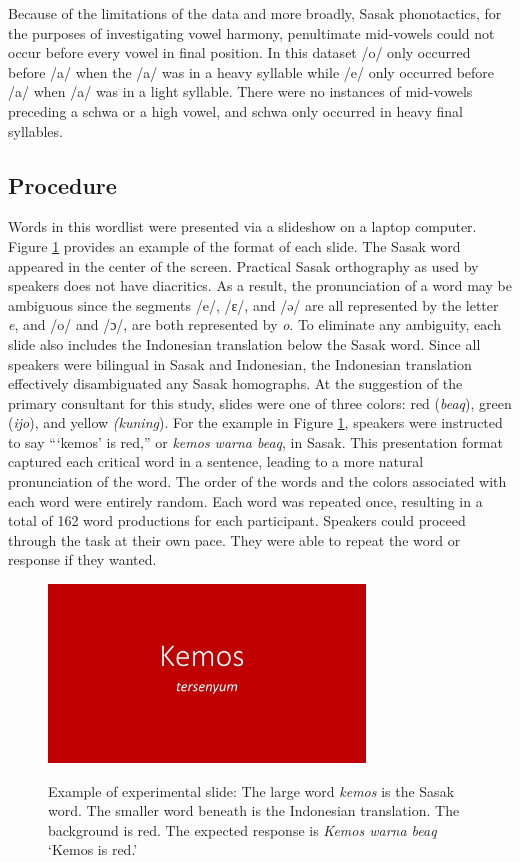 \documentclass[12pt]{ouparticle}
\begin{document}
Because of the limitations of the data and more broadly, Sasak phonotactics, for the purposes of investigating vowel harmony, penultimate mid-vowels could not occur before every vowel in final position. In this dataset /o/ only occurred before /a/ when the /a/ was in a heavy syllable while /e/ only occurred before /a/ when /a/ was in a light syllable. There were no instances of mid-vowels preceding a schwa or a high vowel, and schwa only occurred in heavy final syllables.

\subsection{Procedure}\label{sec:procedure}

Words in this wordlist were presented via a slideshow on a laptop computer. Figure \ref{fig:kemos} provides an example of the format of each slide. The Sasak word appeared in the center of the screen. Practical Sasak orthography as used by speakers does not have diacritics. As a result, the pronunciation of a word may be ambiguous since the segments /e/, /ɛ/, and /ə/ are all represented by the letter \textit{e}, and /o/ and /ɔ/, are both represented by \textit{o}. To eliminate any ambiguity, each slide also includes the Indonesian translation below the Sasak word. Since all speakers were bilingual in Sasak and Indonesian, the Indonesian translation effectively disambiguated any Sasak homographs. At the suggestion of the primary consultant for this study, slides were one of three colors: red (\textit{beaq}), green (\textit{ijo}), and yellow \textit{(kuning}). For the example in Figure \ref{fig:kemos}, speakers were instructed to say “‘kemos’ is red,” or \textit{kemos warna beaq}, in Sasak.  This presentation format captured each critical word in a sentence, leading to a more natural pronunciation of the word. The order of the words and the colors associated with each word were entirely random. Each word was repeated once, resulting in a total of 162 word productions for each participant. Speakers could proceed through the task at their own pace. They were able to repeat the word or response if they wanted.

\begin{figure}[ht]
    \centering
    \caption{Example of experimental slide: The large word \textit{kemos} is the Sasak word. The smaller word beneath is the Indonesian translation. The background is red. The expected response is \textit{Kemos warna beaq} `Kemos is red.'}
    \includegraphics[width=0.75\textwidth]{Figure3.jpg}
    \label{fig:kemos}
\end{figure}
\end{document}
